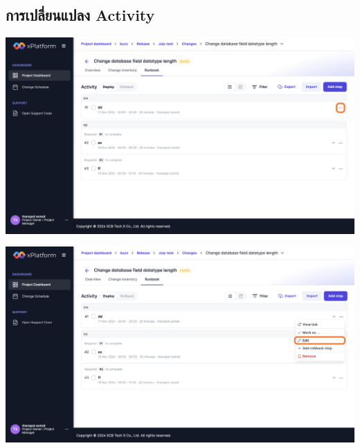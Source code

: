 \subsection{การเปลี่ยนแปลง Activity}
\begin{center}
\includegraphics[width=\linewidth]{resources/pages/change-runbook/update-activity/7.png}

\vspace{1in}

\includegraphics[width=\linewidth]{resources/pages/change-runbook/update-activity/8.png}
\end{center}


